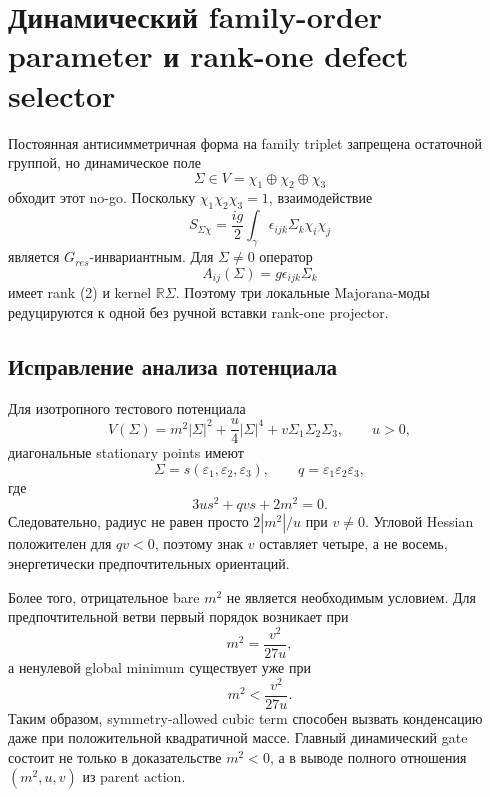 \chapter{Динамический family-order parameter и rank-one defect selector}

Постоянная антисимметричная форма на family triplet запрещена остаточной
группой, но динамическое поле
\begin{equation}
 \Sigma\in V=\chi_1\oplus\chi_2\oplus\chi_3
\end{equation}
обходит этот no-go. Поскольку \(\chi_1\chi_2\chi_3=1\), взаимодействие
\begin{equation}
 S_{\Sigma\chi}
 =\frac{ig}{2}\int_\gamma
 \epsilon_{ijk}\Sigma_k\chi_i\chi_j
\end{equation}
является \(G_{res}\)-инвариантным. Для \(\Sigma\ne0\) оператор
\begin{equation}
 A_{ij}(\Sigma)=g\epsilon_{ijk}\Sigma_k
\end{equation}
имеет rank (2) и kernel \(\mathbb R\Sigma\). Поэтому три локальные
Majorana-моды редуцируются к одной без ручной вставки rank-one projector.

\section{Исправление анализа потенциала}

Для изотропного тестового потенциала
\begin{equation}
 V(\Sigma)=m^2|\Sigma|^2+\frac u4|\Sigma|^4
 +v\Sigma_1\Sigma_2\Sigma_3,
 \qquad u>0,
\end{equation}
диагональные stationary points имеют
\begin{equation}
 \Sigma=s(\varepsilon_1,\varepsilon_2,\varepsilon_3),
 \qquad
 q=\varepsilon_1\varepsilon_2\varepsilon_3,
\end{equation}
где
\begin{equation}
 3us^2+qvs+2m^2=0.
\end{equation}
Следовательно, радиус не равен просто \(2|m^2|/u\) при \(v\ne0\).
Угловой Hessian положителен для \(qv<0\), поэтому знак \(v\) оставляет
четыре, а не восемь, энергетически предпочтительных ориентаций.

Более того, отрицательное bare \(m^2\) не является необходимым условием.
Для предпочтительной ветви первый порядок возникает при
\begin{equation}
 m^2=\frac{v^2}{27u},
\end{equation}
а ненулевой global minimum существует уже при
\begin{equation}
 m^2<\frac{v^2}{27u}.
\end{equation}
Таким образом, symmetry-allowed cubic term способен вызвать конденсацию даже
при положительной квадратичной массе. Главный динамический gate состоит не
только в доказательстве \(m^2<0\), а в выводе полного отношения
\((m^2,u,v)\) из parent action.

